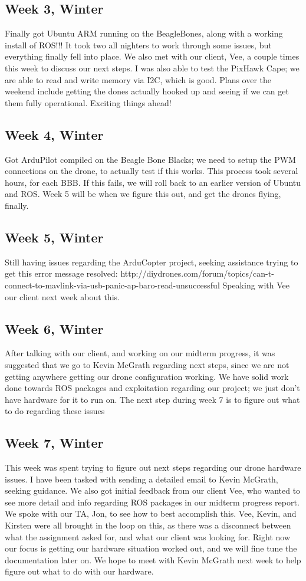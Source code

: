 \subsection{Week 3, Winter}
Finally got Ubuntu ARM running on the BeagleBones, along with a working install of ROS!!! It took two all nighters to work through some issues, but everything finally fell into place. We also met with our client, Vee, a couple times this week to discuss our next steps. I was also able to test the PixHawk Cape; we are able to read and write memory via I2C, which is good. Plans over the weekend include getting the dones actually hooked up and seeing if we can get them fully operational. Exciting things ahead!
\subsection{Week 4, Winter}
Got ArduPilot compiled on the Beagle Bone Blacks; we need to setup the PWM connections on the drone, to actually test if this works. This process took several hours, for each BBB. If this fails, we will roll back to an earlier version of Ubuntu and ROS. Week 5 will be when we figure this out, and get the drones flying, finally.
\subsection{Week 5, Winter}
Still having issues regarding the ArduCopter project, seeking assistance trying to get this error message resolved: http://diydrones.com/forum/topics/can-t-connect-to-mavlink-via-usb-panic-ap-baro-read-unsuccessful Speaking with Vee our client next week about this.
\subsection{Week 6, Winter}
After talking with our client, and working on our midterm progress, it was suggested that we go to Kevin McGrath regarding next steps, since we are not getting anywhere getting our drone configuration working. We have solid work done towards ROS packages and exploitation regarding our project; we just don't have hardware for it to run on. The next step during week 7 is to figure out what to do regarding these issues
\subsection{Week 7, Winter}
This week was spent trying to figure out next steps regarding our drone hardware issues. I have been tasked with sending a detailed email to Kevin McGrath, seeking guidance. We also got initial feedback from our client Vee, who wanted to see more detail and info regarding ROS packages in our midterm progress report. We spoke with our TA, Jon, to see how to best accomplish this. Vee, Kevin, and Kirsten were all brought in the loop on this, as there was a disconnect between what the assignment asked for, and what our client was looking for. Right now our focus is getting our hardware situation worked out, and we will fine tune the documentation later on. We hope to meet with Kevin McGrath next week to help figure out what to do with our hardware.

